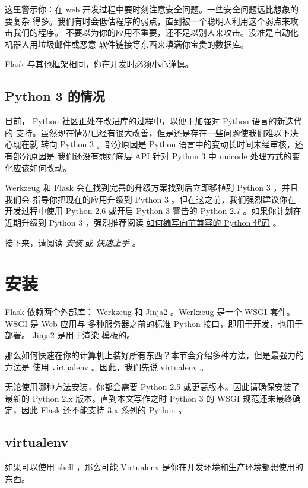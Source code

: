 \documentclass[a4paper,12pt]{sphinxmanual}
\begin{document}
这里警示你：在 web 开发过程中要时刻注意安全问题。一些安全问题远比想象的要复杂
得多。我们有时会低估程序的弱点，直到被一个聪明人利用这个弱点来攻击我们的程序。
不要以为你的应用不重要，还不足以别人来攻击。没准是自动化机器人用垃圾邮件或恶意
软件链接等东西来填满你宝贵的数据库。

Flask 与其他框架相同，你在开发时必须小心谨慎。


\section{Python 3 的情况}
\label{advanced_foreword:python-3}
目前， Python 社区正处在改进库的过程中，以便于加强对 Python 语言的新迭代的
支持。虽然现在情况已经有很大改善，但是还是存在一些问题使我们难以下决心现在就
转向 Python 3 。部分原因是 Python 语言中的变动长时间未经审核，还有部分原因是
我们还没有想好底层 API 针对 Python 3 中 unicode 处理方式的变化应该如何改动。

Werkzeug 和 Flask 会在找到完善的升级方案找到后立即移植到 Python 3 ，并且我们会
指导你把现在的应用升级到 Python 3 。但在这之前，我们强烈建议你在开发过程中使用
Python 2.6 或开启 Python 3 警告的 Python 2.7 。如果你计划在近期升级到 Python
3 ，强烈推荐阅读 \href{http://lucumr.pocoo.org/2011/1/22/forwards-compatible-python/}{如何编写向前兼容的 Python 代码} 。

接下来，请阅读 {\hyperref[installation:installation]{\emph{安装}}} 或 {\hyperref[quickstart:quickstart]{\emph{快速上手}}} 。


\chapter{安装}
\label{installation:installation}\label{installation::doc}\label{installation:id1}
Flask 依赖两个外部库： \href{http://werkzeug.pocoo.org/}{Werkzeug} 和 \href{http://jinja.pocoo.org/2/}{Jinja2} 。Werkzeug 是一个 WSGI 套件。 WSGI 是 Web 应用与
多种服务器之前的标准 Python 接口，即用于开发，也用于部署。 Jinja2 是用于渲染
模板的。

那么如何快速在你的计算机上装好所有东西？本节会介绍多种方法，但是最强力的方法是
使用 virtualenv 。因此，我们先说 virtualenv 。

无论使用哪种方法安装，你都会需要 Python 2.5 或更高版本。因此请确保安装了最新的
Python 2.x 版本。直到本文写作之时 Python 3 的 WSGI 规范还未最终确定，因此 Flask
还不能支持 3.x 系列的 Python 。


\section{virtualenv}
\label{installation:virtualenv}\label{installation:id2}
如果可以使用 shell ，那么可能 Virtualenv 是你在开发环境和生产环境都想使用的
东西。
\end{document}
